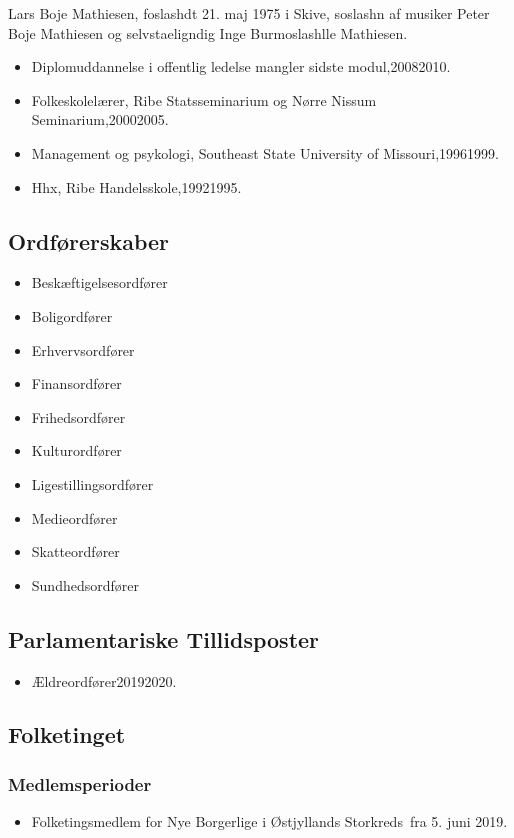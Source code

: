 \documentclass[11pt, a4paper]{awesome-cv}
\begin{document}
\makecvheader[R]
\makelettertitle
\begin{cvletter}
Lars Boje Mathiesen, foslashdt 21. maj 1975 i Skive, soslashn af musiker Peter Boje Mathiesen og selvstaeligndig Inge Burmoslashlle Mathiesen.

\begin{itemize}
\item Diplomuddannelse i offentlig ledelse mangler sidste modul,20082010.
\item Folkeskolelærer, Ribe Statsseminarium og Nørre Nissum Seminarium,20002005.
\item Management og psykologi, Southeast State University of Missouri,19961999.
\item Hhx, Ribe Handelsskole,19921995.
\end{itemize}
\subsection*{Ordførerskaber}
\begin{itemize}
\item Beskæftigelsesordfører
\item Boligordfører
\item Erhvervsordfører
\item Finansordfører
\item Frihedsordfører
\item Kulturordfører
\item Ligestillingsordfører
\item Medieordfører
\item Skatteordfører
\item Sundhedsordfører
\end{itemize}
\subsection*{Parlamentariske Tillidsposter}
\begin{itemize}
\item Ældreordfører20192020.
\end{itemize}
\subsection*{Folketinget}
\subsubsection*{Medlemsperioder}
\begin{itemize}
\item Folketingsmedlem for Nye Borgerlige i Østjyllands Storkreds fra 5. juni 2019.
\end{itemize}

\end{cvletter}
\end{document}
